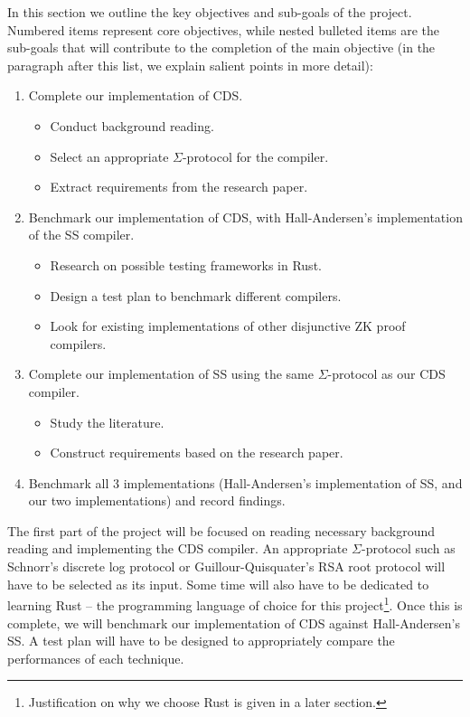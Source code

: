 \documentclass[a4paper,fleqn,12pt]{article}
\begin{document}
In this section we outline the key objectives and sub-goals of the project. Numbered items represent core objectives, while nested bulleted items are the sub-goals that will contribute to the completion of the main objective (in the paragraph after this list, we explain salient points in more detail):
\begin{enumerate}
    \item Complete our implementation of CDS.
    \begin{itemize}
        \item Conduct background reading.
        \item Select an appropriate $\Sigma$-protocol for the compiler.
        \item Extract requirements from the research paper. 
    \end{itemize}
    \item Benchmark our implementation of CDS, with Hall-Andersen's implementation \cite{MHAStackSig} of the SS compiler.
    \begin{itemize}
        \item Research on possible testing frameworks in Rust. 
        \item Design a test plan to benchmark different compilers. 
        \item Look for existing implementations of other disjunctive ZK proof compilers.
    \end{itemize}
    \item Complete our implementation of SS using the same $\Sigma$-protocol as our CDS compiler.
    \begin{itemize}
        \item Study the literature.
        \item Construct requirements based on the research paper.
    \end{itemize}
    \item Benchmark all 3 implementations (Hall-Andersen's implementation of SS, and our two implementations) and record findings.
\end{enumerate}
The first part of the project will be focused on reading necessary background reading and implementing the CDS compiler. An appropriate $\Sigma$-protocol such as Schnorr's discrete log protocol \cite{Schnorr} or Guillour-Quisquater's RSA root protocol \cite{Guillou1988APZ} will have to be selected as its input. Some time will also have to be dedicated to learning Rust \cite{Rust} -- the programming language of choice for this project\footnote{Justification on why we choose Rust is given in a later section.}. Once this is complete, we will benchmark our implementation of CDS against Hall-Andersen's SS. A test plan will have to be designed to appropriately compare the performances of each technique.
\end{document}
